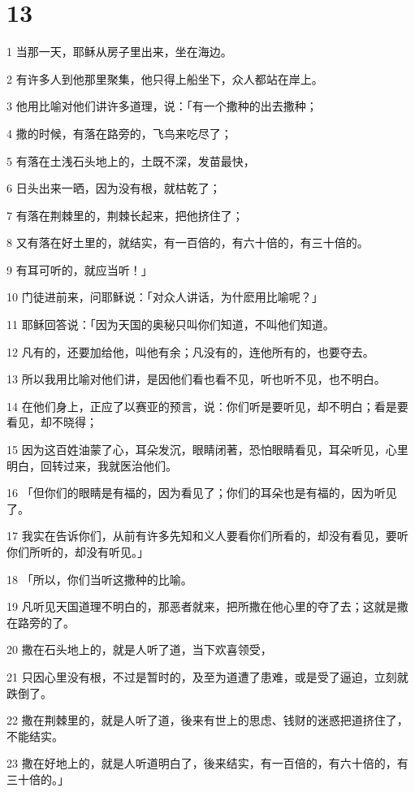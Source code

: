 \chapter{13}

\par 1 当那一天，耶稣从房子里出来，坐在海边。
\par 2 有许多人到他那里聚集，他只得上船坐下，众人都站在岸上。
\par 3 他用比喻对他们讲许多道理，说：「有一个撒种的出去撒种；
\par 4 撒的时候，有落在路旁的，飞鸟来吃尽了；
\par 5 有落在土浅石头地上的，土既不深，发苗最快，
\par 6 日头出来一晒，因为没有根，就枯乾了；
\par 7 有落在荆棘里的，荆棘长起来，把他挤住了；
\par 8 又有落在好土里的，就结实，有一百倍的，有六十倍的，有三十倍的。
\par 9 有耳可听的，就应当听！」
\par 10 门徒进前来，问耶稣说：「对众人讲话，为什麽用比喻呢？」
\par 11 耶稣回答说：「因为天国的奥秘只叫你们知道，不叫他们知道。
\par 12 凡有的，还要加给他，叫他有余；凡没有的，连他所有的，也要夺去。
\par 13 所以我用比喻对他们讲，是因他们看也看不见，听也听不见，也不明白。
\par 14 在他们身上，正应了以赛亚的预言，说：你们听是要听见，却不明白；看是要看见，却不晓得；
\par 15 因为这百姓油蒙了心，耳朵发沉，眼睛闭著，恐怕眼睛看见，耳朵听见，心里明白，回转过来，我就医治他们。
\par 16 「但你们的眼睛是有福的，因为看见了；你们的耳朵也是有福的，因为听见了。
\par 17 我实在告诉你们，从前有许多先知和义人要看你们所看的，却没有看见，要听你们所听的，却没有听见。」
\par 18 「所以，你们当听这撒种的比喻。
\par 19 凡听见天国道理不明白的，那恶者就来，把所撒在他心里的夺了去；这就是撒在路旁的了。
\par 20 撒在石头地上的，就是人听了道，当下欢喜领受，
\par 21 只因心里没有根，不过是暂时的，及至为道遭了患难，或是受了逼迫，立刻就跌倒了。
\par 22 撒在荆棘里的，就是人听了道，後来有世上的思虑、钱财的迷惑把道挤住了，不能结实。
\par 23 撒在好地上的，就是人听道明白了，後来结实，有一百倍的，有六十倍的，有三十倍的。」
